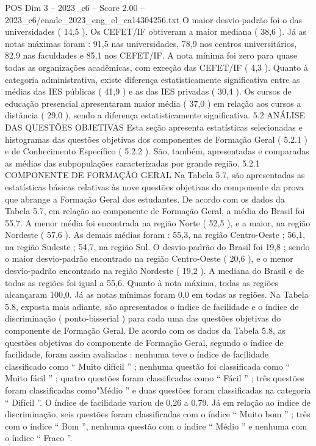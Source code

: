 \begin{textsample}{POS Dim 3 – 2023\_c6 – Score 2.00 – 2023\_c6/enade\_2023\_eng\_el\_ca14304256.txt}
O maior desvio-padrão foi o das universidades ( 14,5 ).
Os CEFET/IF obtiveram a maior mediana ( 38,6 ).
Já as notas máximas foram : 91,5 nas universidades, 78,9 nos centros universitários, 82,9 nas faculdades e 85,1 nos CEFET/IF.
A nota mínima foi zero para quase todas as organizações acadêmicas, com exceção das CEFET/IF ( 4,3 ).
Quanto à categoria administrativa, existe diferença estatisticamente significativa entre as médias das IES públicas ( 41,9 ) e as das IES privadas ( 30,4 ).
Os cursos de educação presencial apresentaram maior média ( 37,0 ) em relação aos cursos a distância ( 29,0 ), sendo a diferença estatisticamente significativa. 5.2 ANÁLISE DAS QUESTÕES OBJETIVAS Esta seção apresenta estatísticas selecionadas e histogramas das questões objetivas dos componentes de Formação Geral ( 5.2.1 ) e de Conhecimento Específico ( 5.2.2 ).
São, também, apresentadas e comparadas as médias das subpopulações caracterizadas por grande região. 5.2.1 COMPONENTE DE FORMAÇÃO GERAL Na Tabela 5.7, são apresentadas as estatísticas básicas relativas às nove questões objetivas do componente da prova que abrange a Formação Geral dos estudantes.
De acordo com os dados da Tabela 5.7, em relação ao componente de Formação Geral, a média do Brasil foi 55,7.
A menor média foi encontrada na região Norte ( 52,5 ), e a maior, na região Nordeste ( 57,6 ).
As demais médias foram : 55,3, na região Centro-Oeste ; 56,1, na região Sudeste ; 54,7, na região Sul.
O desvio-padrão do Brasil foi 19,8 ; sendo o maior desvio-padrão encontrado na região Centro-Oeste ( 20,6 ), e o menor desvio-padrão encontrado na região Nordeste ( 19,2 ).
A mediana do Brasil e de todas as regiões foi igual a 55,6.
Quanto à nota máxima, todas as regiões alcançaram 100,0.
Já as notas mínimas foram 0,0 em todas as regiões.
Na Tabela 5.8, exposta mais adiante, são apresentados o índice de facilidade e o índice de discriminação ( ponto-bisserial ) para cada uma das questões objetivas do componente de Formação Geral.
De acordo com os dados da Tabela 5.8, as questões objetivas do componente de Formação Geral, segundo o índice de facilidade, foram assim avaliadas : nenhuma teve o índice de facilidade classificado como “ Muito difícil ” ; nenhuma questão foi classificada como “ Muito fácil ” ; quatro questões foram classificadas como “ Fácil ” ; três questões foram classificadas como"Médio ” e duas questões foram classificadas na categoria “ Difícil ”.
O índice de facilidade variou de 0,26 a 0,79.
Já em relação ao índice de discriminação, seis questões foram classificadas com o índice “ Muito bom ” ; três com o índice “ Bom ”, nenhuma questão com o índice “ Médio ” e nenhuma com o índice “ Fraco ”.

\end{textsample}
